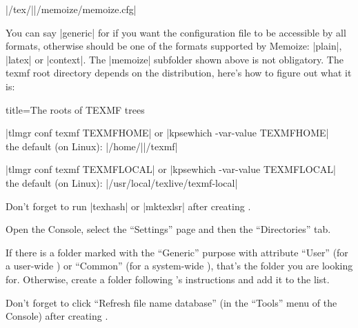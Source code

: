 \documentclass[a4paper,11pt]{article}
\begin{document}
\begin{center}
  |/tex/||/memoize/memoize.cfg|
\end{center}

You can say |generic| for  if you want the configuration file to
be accessible by all formats, otherwise  should be one of the
formats supported by Memoize: |plain|, |latex| or |context|.  The |memoize|
subfolder shown above is not obligatory.  The texmf root directory depends on
the distribution, here's how to figure out what it is:

\begin{tcboxedraster}
  [raster columns=1, raster valign=top, raster force size=false]
  {title=The roots of TEXMF trees}
\begin{tcolorbox}[title={\TeXLive[white]\hfill\url[white](https://){tug.org/texlive}}]
  \begin{description}[itemsep=0pt]
  \item[user-wide]
    |tlmgr conf texmf TEXMFHOME|
    or |kpsewhich -var-value TEXMFHOME|\\
    the default (on Linux): |/home/||/texmf|
  \item[system-wide]
    |tlmgr conf texmf TEXMFLOCAL|
    or |kpsewhich -var-value TEXMFLOCAL|\\
    the default (on Linux): |/usr/local/texlive/texmf-local|
  \end{description}

  \smallskip
  Don't forget to run |texhash| or |mktexlsr| after creating .
\end{tcolorbox}
\begin{tcolorbox}[title={\MiKTeX[white]\hfill\url[white](https://){miktex.org}},
    before upper={\parskip0.3\baselineskip plus 2pt\relax},]
  Open the \MiKTeX Console, select the ``Settings'' page and then the
  ``Directories'' tab.

  If there is a folder marked with the ``Generic'' purpose with attribute
  ``User'' (for a user-wide ) or ``Common'' (for a system-wide
    ), that's the folder you are looking for.  Otherwise, create a
  folder following \MiKTeX's instructions and add it to the list.
  
  Don't forget to click ``Refresh file name database'' (in the ``Tools'' menu
    of the \MiKTeX Console) after creating .
\end{tcolorbox}
\end{tcboxedraster}
\end{document}
